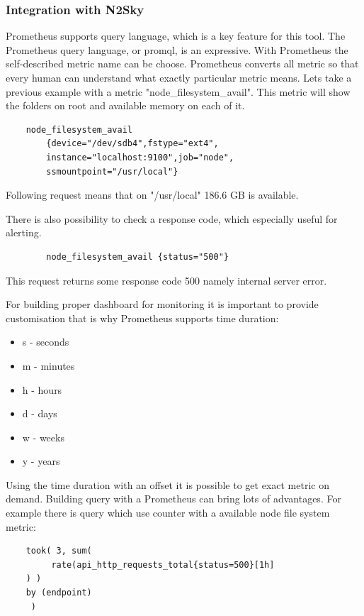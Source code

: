 \subsubsection{Integration with N2Sky}\label{Integration with N2Sky}

Prometheus supports query language, which is a key feature for this tool. The Prometheus query language, or promql, is an expressive. 
With Prometheus the self-described metric name can be choose. Prometheus converts all metric so that every human can understand what exactly particular metric means. Lets take a previous example with a metric "node\_filesystem\_avail". This metric will show the folders on root and available memory on each of it.

\begin{lstlisting}
	node_filesystem_avail 
		{device="/dev/sdb4",fstype="ext4",
		instance="localhost:9100",job="node",
		ssmountpoint="/usr/local"}
\end{lstlisting}

Following request means that on "/usr/local" 186.6 GB is available. 

There is also possibility to check a response code, which especially useful for alerting. 

\begin{lstlisting}
		node_filesystem_avail {status="500"}
\end{lstlisting}

This request returns some response code 500 namely internal server error. 

For building proper dashboard for monitoring it is important to provide customisation that is why Prometheus supports time duration:

\begin{itemize}
\item s - seconds
\item m - minutes
\item h - hours
\item d - days
\item w - weeks
\item y - years
\end{itemize}

Using the time duration with an offset it is possible to get exact metric on demand. 
Building query with a Prometheus can bring lots of advantages. For example there is query which use counter with a available node file system metric:

\begin{lstlisting}
	took( 3, sum(
		 rate(api_http_requests_total{status=500}[1h]
	) )
 	by (endpoint)
	 )
\end{lstlisting}

